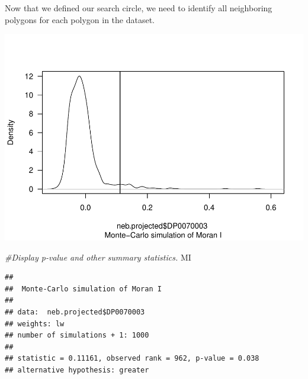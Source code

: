 \documentclass[]{article}
\newenvironment{Shaded}{\begin{snugshade}}{\end{snugshade}}
\newcommand{\AttributeTok}[1]{\textcolor[rgb]{0.77,0.63,0.00}{#1}}
\newcommand{\CommentTok}[1]{\textcolor[rgb]{0.56,0.35,0.01}{\textit{#1}}}
\newcommand{\DecValTok}[1]{\textcolor[rgb]{0.00,0.00,0.81}{#1}}
\newcommand{\FunctionTok}[1]{\textcolor[rgb]{0.00,0.00,0.00}{#1}}
\newcommand{\NormalTok}[1]{#1}
\newcommand{\OtherTok}[1]{\textcolor[rgb]{0.56,0.35,0.01}{#1}}
\newcommand{\SpecialCharTok}[1]{\textcolor[rgb]{0.00,0.00,0.00}{#1}}
\newcommand{\StringTok}[1]{\textcolor[rgb]{0.31,0.60,0.02}{#1}}
\begin{document}
Now that we defined our search circle, we need to identify all
neighboring polygons for each polygon in the dataset.

\begin{Shaded}
\end{Shaded}

\includegraphics{lab03_files/figure-latex/calcnb-1.pdf}

\begin{Shaded}
\begin{Highlighting}[]
\CommentTok{\#Display p{-}value and other summary statistics.}
\NormalTok{MI}
\end{Highlighting}
\end{Shaded}

\begin{verbatim}
## 
##  Monte-Carlo simulation of Moran I
## 
## data:  neb.projected$DP0070003 
## weights: lw  
## number of simulations + 1: 1000 
## 
## statistic = 0.11161, observed rank = 962, p-value = 0.038
## alternative hypothesis: greater
\end{verbatim}
\end{document}
